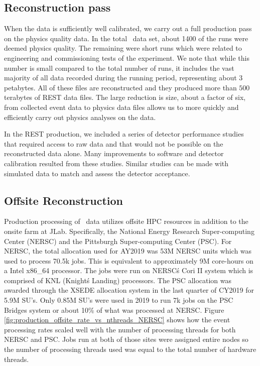 \subsection{Reconstruction pass \label{sec:recreconstruction}}

When the data is sufficiently well calibrated, we carry out a full production pass on the physics quality data. In the total \GX~data set, about 1400 of the runs were deemed physics quality. The remaining were short runs which were related to engineering and commissioning tests of the experiment. We note that while this number is small compared to the total number of runs, it includes the vast majority of all data recorded during the running period, representing about 3 petabytes. All of these files are reconstructed and they produced more than $500$ terabytes of REST data files. The large reduction is size, about a factor of six, from collected event data to physics data files allows us to  more quickly and efficiently carry out physics analyses on the data.

In the REST production, we included a series of detector performance studies that required access to raw data and that would not be possible on the reconstructed data alone. Many improvements to software and detector calibration resulted from these studies. Similar studies can be made with simulated data to match and assess the detector acceptance.

\subsection{Offsite Reconstruction}
\label{sec:recoffsite}

Production processing of \GX~data utilizes offsite HPC resources in addition to the onsite farm at JLab. Specifically, the National Energy Research Super-computing Center (NERSC) and the Pittsburgh Super-computing Center (PSC). For NERSC, the total allocation used for AY2019 was 53M NERSC units which was used to process 70.5k jobs. This is equivalent to approximately 9M core-hours on a Intel x86\_64 processor. The jobs were run on NERSC\'s Cori II system which is comprised of KNL (Knight\'s Landing) processors. The PSC allocation was awarded through the XSEDE allocation system in the last quarter of CY2019 for 5.9M SU's. Only 0.85M SU's were used in 2019 to run 7k jobs on the PSC Bridges system or about 10\% of what was processed at NERSC. Figure \ref{fig:production_offsite_rate_vs_nthreads_NERSC} shows how the event processing rates scaled well with the number of processing threads for both NERSC and PSC. Jobs run at both of those sites were assigned entire nodes so the number of processing threads used was equal to the total number of hardware threads.

